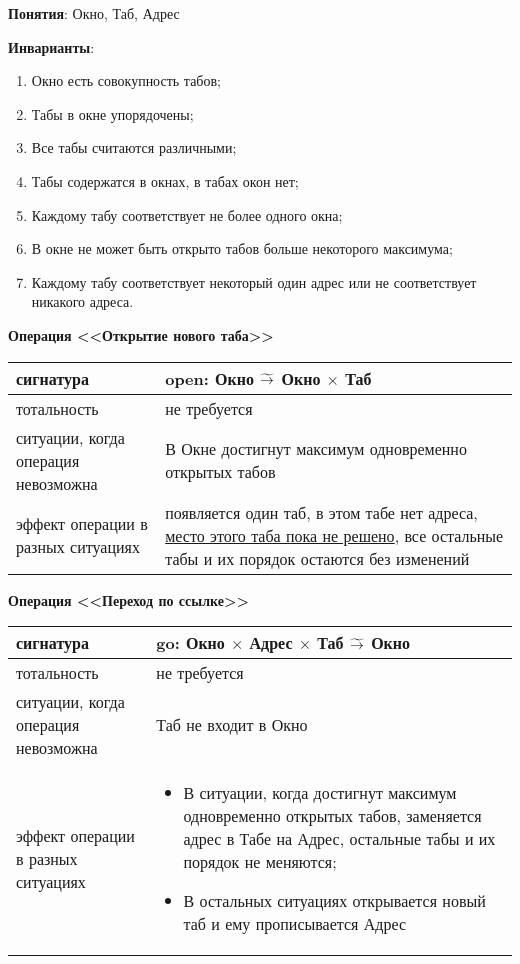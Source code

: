 \documentclass[14pt, twoside]{extreport}
\begin{document}
{\sf
\textbf{Понятия}: Окно, Таб, Адрес

\textbf{Инварианты}:
\begin{enumerate}
  \item Окно есть совокупность табов;
  \item Табы в окне упорядочены;
  \item Все табы считаются различными;
  \item Табы содержатся в окнах, в табах окон нет;
  \item Каждому табу соответствует не более одного окна;
  \item В окне не может быть открыто табов больше некоторого максимума;
  \item Каждому табу соответствует некоторый один адрес или не соответствует никакого адреса.
\end{enumerate}

\textbf{Операция <<Открытие нового таба>>}

\begin{tabular}{|p{}|p{}|}
  \hline
  сигнатура & open: Окно $\widetilde{\rightarrow}$ Окно $\times$ Таб \\ \hline
  тотальность & не требуется \\ \hline
  ситуации, когда операция невозможна & В Окне достигнут максимум одновременно открытых табов \\ \hline
  эффект операции в разных ситуациях & появляется один таб, в этом табе нет адреса, \underline{место этого таба пока не решено}, все остальные табы и их порядок остаются без изменений \\ \hline
\end{tabular}

\textbf{Операция <<Переход по ссылке>>}

\begin{tabular}{|p{}|p{}|}
  \hline
  сигнатура & go: Окно $\times$ Адрес $\times$ Таб $\widetilde{\rightarrow}$ Окно \\ \hline
  тотальность & не требуется \\ \hline
  ситуации, когда операция невозможна & Таб не входит в Окно \\ \hline
  эффект операции в разных ситуациях & \begin{itemize}\item В ситуации, когда достигнут максимум одновременно открытых табов, заменяется адрес в Табе на Адрес, остальные табы и их порядок не меняются; \item В остальных ситуациях открывается новый таб и ему прописывается Адрес\end{itemize} \\ \hline
\end{tabular}

}
\end{document}
